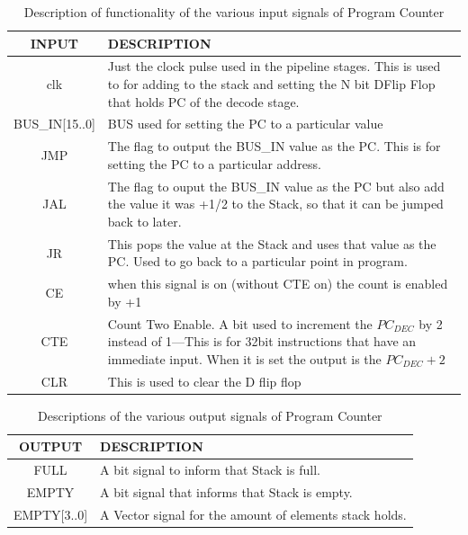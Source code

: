 \documentclass{article}
\begin{document}
\begin{table}[H]
    \centering
    \begin{tabularx}{\linewidth}{|c|X|}
\hline
\textbf{INPUT} & \textbf{DESCRIPTION} \\ \hline
clk & Just the clock pulse used in the pipeline stages. This is used to for adding to the stack and setting the N bit DFlip Flop that holds PC of the decode stage.  \\ \hline
BUS\_IN[15..0] & BUS used for setting the PC to a particular value\\ \hline
JMP & The flag to output the BUS\_IN value as the PC. This is for setting the PC to a particular address.\\ \hline
JAL & The flag to ouput the BUS\_IN value as the PC but also add the value it was +1/2 to the Stack, so that it can be jumped back to later. \\ \hline
JR &  This pops the value at the Stack and uses that value as the PC. Used to go back to a particular point in program.\\ \hline
CE & when this signal is on (without CTE on) the count is enabled by +1\\ \hline 
CTE & Count Two Enable. A bit used to increment the $PC_{DEC}$ by 2 instead of 1—This is for 32bit instructions that have an immediate input. When it is set the output is the $PC_{DEC} +2$ \\ \hline
CLR & This is used to clear the D flip flop \\ \hline
    \end{tabularx}
    \caption{Description of functionality of the various input signals of Program Counter}
    \label{tab:input_pc}
\end{table}

\begin{table}[H]
    \centering
    \begin{tabular}{|c|p{15cm}|}
\hline
\textbf{OUTPUT} & \textbf{DESCRIPTION} \\ \hline
FULL & A bit signal to inform that Stack is full. \\ \hline
EMPTY & A bit signal that informs that Stack is empty. \\ \hline
EMPTY[3..0] & A Vector signal for the amount of elements stack holds. \\ \hline

    \end{tabular}
    \caption{Descriptions of the various output signals of Program Counter}
    \label{tab:output_pc}
\end{table}
\end{document}
